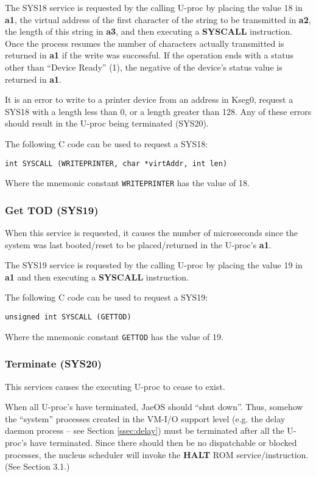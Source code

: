 The SYS18 service is requested by the calling U-proc by placing the value 18 in \textbf{a1}, the virtual address of the first character of the string to be transmitted in \textbf{a2}, the length of this string in \textbf{a3}, and then executing a \textbf{SYSCALL} instruction. 
Once the process resumes the number of characters actually transmitted is returned in \textbf{a1} if the write was successful. If the operation ends with a status other than ``Device Ready'' (1), the negative of the device's status value is returned in \textbf{a1}.

It is an error to write to a printer device from an address in Kseg0, request a SYS18 with a length less than 0, or a length greater than 128. Any of these errors should result in the U-proc being terminated (SYS20).

The following C code can be used to request a SYS18:
\begin{center}
\verb+int SYSCALL (WRITEPRINTER, char *virtAddr, int len)+
\end{center}
Where the mnemonic constant \verb+WRITEPRINTER+ has the value of 18.


\subsubsection{Get TOD (SYS19)}
When this service is requested, it causes the number of microseconds since the system was last booted/reset to be placed/returned in the U-proc's \textbf{a1}.

The SYS19 service is requested by the calling U-proc by placing the value 19 in \textbf{a1} and then executing a \textbf{SYSCALL} instruction.

The following C code can be used to request a SYS19:
\begin{center}
\verb+unsigned int SYSCALL (GETTOD)+
\end{center}
Where the mnemonic constant \verb+GETTOD+ has the value of 19.


\subsubsection{Terminate (SYS20)}
This services causes the executing U-proc to cease to exist.

When all U-proc's have terminated, JaeOS should ``shut down''. 
Thus, somehow the ``system'' processes created in the VM-I/O support level (e.g. the delay daemon process – see Section \ref{ssec:delay}) must be terminated after all the U-proc's have terminated. 
Since there should then be no dispatchable or blocked processes, the nucleus scheduler will invoke the \textbf{HALT} ROM service/instruction. (See Section 3.1.)

